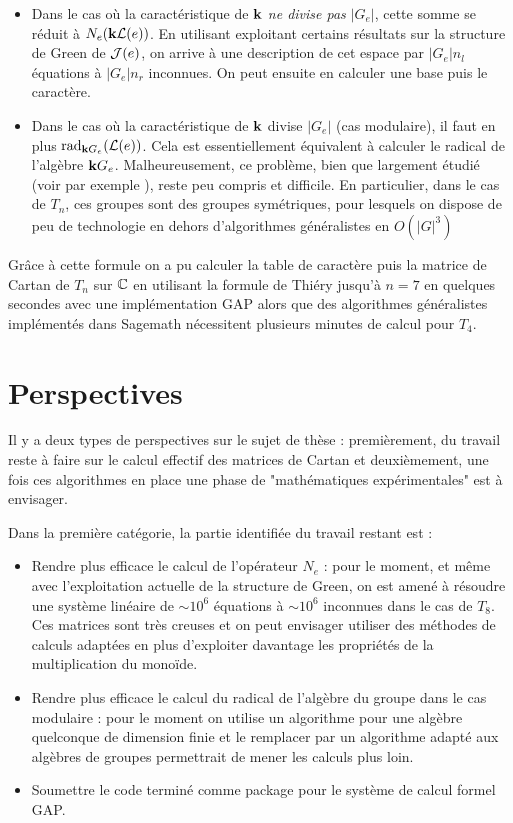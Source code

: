 \documentclass{article}
\begin{document}
	\begin{itemize}
		\item Dans le cas où la caractéristique de $\mathbf{k}$ \emph{ne divise pas} $|G_e|$, cette somme se réduit à $N_e(\mathbf{k} \mathcal{L}(e))$. En utilisant exploitant certains résultats sur la structure de Green de $\mathcal{J}(e)$, on arrive à une description de cet espace par $|G_e|n_l$ équations à $|G_e|n_r$ inconnues. On peut ensuite en calculer une base puis le caractère.
		\item Dans le cas où la caractéristique de $\mathbf{k}$ divise $|G_e|$ (cas modulaire), il faut en plus $\operatorname{rad}_{\mathbf{k} G_e}(\mathcal{L}(e))$. Cela est essentiellement équivalent à calculer le radical de l'algèbre $\mathbf{k} G_e$. Malheureusement, ce problème, bien que largement étudié (voir par exemple \cite{karpilovsky1987jacobson}), reste peu compris et difficile. En particulier, dans le cas de $T_n$, ces groupes sont des groupes symétriques, pour lesquels on dispose de peu de technologie en dehors d'algorithmes généralistes en $O(|G|^3)$ 
	\end{itemize}
	
	Grâce à cette formule on a pu calculer la table de caractère puis la matrice de Cartan de $T_n$ sur $\mathbb{C}$ en utilisant la formule de Thiéry jusqu'à $n = 7$ en quelques secondes avec une implémentation GAP alors que des algorithmes généralistes implémentés dans Sagemath nécessitent plusieurs minutes de calcul pour $T_4$.
	
	\section*{Perspectives}
	
	Il y a deux types de perspectives sur le sujet de thèse : premièrement, du travail reste à faire sur le calcul effectif des matrices de Cartan et deuxièmement, une fois ces algorithmes en place une phase de "mathématiques expérimentales" est à envisager.
	
	Dans la première catégorie, la partie identifiée du travail restant est :
	\begin{itemize}
		\item Rendre plus efficace le calcul de l'opérateur $N_e$ : pour le moment, et même avec l'exploitation actuelle de la structure de Green, on est amené à résoudre une système linéaire de $\sim 10^6$ équations à $\sim 10^6$ inconnues dans le cas de $T_8$. Ces matrices sont très creuses et on peut envisager utiliser des méthodes de calculs adaptées en plus d'exploiter davantage les propriétés de la multiplication du monoïde.
		\item Rendre plus efficace le calcul du radical de l'algèbre du groupe dans le cas modulaire : pour le moment on utilise un algorithme pour une algèbre quelconque de dimension finie et le remplacer par un algorithme adapté aux algèbres de groupes permettrait de mener les calculs plus loin.
		\item Soumettre le code terminé comme package pour le système de calcul formel GAP.
	\end{itemize}
\end{document}
